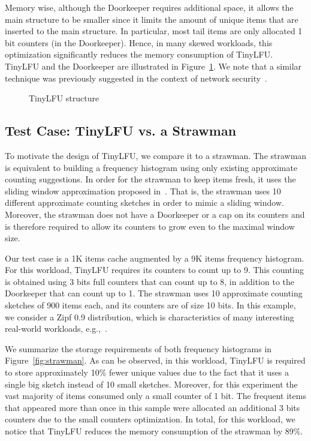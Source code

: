 \documentclass[10pt,a4paper]{article}
\begin{document}
Memory wise, although the Doorkeeper requires additional space, it allows the main structure to be smaller since it limits the amount of unique items that are inserted to the main structure.
In particular, most tail items are only allocated 1 bit counters (in the Doorkeeper).
Hence, in many skewed workloads, this optimization significantly reduces the memory consumption of TinyLFU.
TinyLFU and the Doorkeeper are illustrated in Figure~\ref{fig:tinyLFU}.
We note that a similar technique was previously suggested in the context of network security~\cite{DoorKeeper}.

\begin{figure}[t]
\caption{TinyLFU structure}
\label{fig:tinyLFU}
\end{figure}

\subsection{Test Case: TinyLFU vs. a Strawman}
To motivate the design of TinyLFU, we compare it to a strawman.
The strawman is equivalent to building a frequency histogram using only existing approximate counting suggestions.
In order for the strawman to keep items fresh, it uses the sliding window approximation proposed in~\cite{SUNSHINE}.
That is, the strawman uses 10 different approximate counting sketches in order to mimic a sliding window.
Moreover, the strawman does not have a Doorkeeper or a cap on its counters and is therefore required to allow its counters to grow even to the maximal window size.

Our test case is a 1K items cache augmented by a 9K items frequency histogram.
For this workload, TinyLFU requires its counters to count up to 9.
This counting is obtained using 3 bits full counters that can count up to 8, in addition to the Doorkeeper that can count up to 1.
The strawman uses 10 approximate counting sketches of 900 items each, and its counters are of size 10 bits. In this example, we consider a Zipf 0.9 distribution, which is characteristics of many interesting real-world workloads, e.g.,~\cite{BCFPS99,ZipfCaching,ZipfYouTube}.

We summarize the storage requirements of both frequency histograms in Figure~\ref{fig:strawman}.
As can be observed, in this workload, TinyLFU is required to store approximately 10\% fewer unique values due to the fact that it uses a single big sketch instead of 10 small sketches.
Moreover, for this experiment the vast majority of items consumed only a small counter of 1 bit.
The frequent items that appeared more than once in this sample were allocated an additional 3 bits counters due to the small counters optimization.
In total, for this workload, we notice that TinyLFU reduces the memory consumption of the strawman by 89\%.
\end{document}
